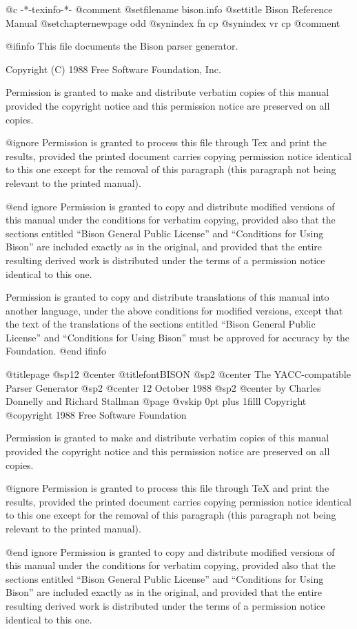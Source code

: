  @c -*-texinfo-*-
@comment %
@setfilename bison.info
@settitle Bison Reference Manual
@setchapternewpage odd
@synindex fn cp
@synindex vr cp
@comment %

@ifinfo
This file documents the Bison parser generator.

Copyright (C) 1988 Free Software Foundation, Inc.

Permission is granted to make and distribute verbatim copies of
this manual provided the copyright notice and this permission notice
are preserved on all copies.

@ignore
Permission is granted to process this file through Tex and print the
results, provided the printed document carries copying permission
notice identical to this one except for the removal of this paragraph
(this paragraph not being relevant to the printed manual).

@end ignore
Permission is granted to copy and distribute modified versions of this
manual under the conditions for verbatim copying, provided also that the
sections entitled ``Bison General Public License'' and ``Conditions for
Using Bison'' are included exactly as in the original, and provided that
the entire resulting derived work is distributed under the terms of a
permission notice identical to this one.

Permission is granted to copy and distribute translations of this manual
into another language, under the above conditions for modified versions,
except that the text of the translations of the sections entitled ``Bison
General Public License'' and ``Conditions for Using Bison'' must be
approved for accuracy by the Foundation.
@end ifinfo

@titlepage
@sp12 
@center @titlefont{BISON}
@sp2
@center The YACC-compatible Parser Generator
@sp2
@center 12 October 1988
@sp2 
@center by Charles Donnelly and Richard Stallman
@page
@vskip 0pt plus 1filll
Copyright @copyright{} 1988 Free Software Foundation

Permission is granted to make and distribute verbatim copies of
this manual provided the copyright notice and this permission notice
are preserved on all copies.

@ignore
Permission is granted to process this file through TeX and print the
results, provided the printed document carries copying permission
notice identical to this one except for the removal of this paragraph
(this paragraph not being relevant to the printed manual).

@end ignore
Permission is granted to copy and distribute modified versions of this
manual under the conditions for verbatim copying, provided also that the
sections entitled ``Bison General Public License'' and ``Conditions for
Using Bison'' are included exactly as in the original, and provided that
the entire resulting derived work is distributed under the terms of a
permission notice identical to this one.

